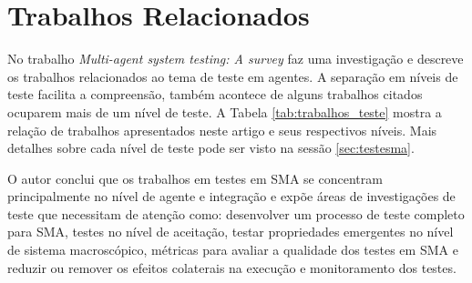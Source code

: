 \chapter{Trabalhos Relacionados}

No trabalho \textit{Multi-agent system testing: A survey} \citet{houhamdi2011multi} faz uma investigação e descreve os trabalhos relacionados ao tema de teste em agentes. A separação em níveis de teste facilita a compreensão, também acontece de alguns trabalhos citados ocuparem mais de um nível de teste. A Tabela \ref{tab:trabalhos_teste} mostra a relação de trabalhos apresentados neste artigo e seus respectivos níveis. Mais detalhes sobre cada nível de teste pode ser visto na sessão \ref{sec:testesma}.

O autor conclui que os trabalhos em testes em SMA se concentram principalmente no nível de agente e integração e expõe áreas de investigações de teste que necessitam de atenção como: desenvolver um processo de teste completo para SMA, testes no nível de aceitação, testar propriedades emergentes no nível de sistema macroscópico, métricas para avaliar a qualidade dos testes em SMA e reduzir ou remover os efeitos colaterais na execução e monitoramento dos testes.

